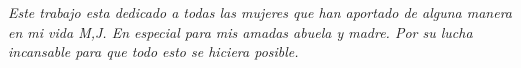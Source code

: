 
\begin{dedication} %

\textit{Este trabajo esta dedicado a todas las mujeres que han aportado de alguna manera en mi vida M,J. En especial para mis amadas abuela y madre. Por su lucha incansable para que todo esto se hiciera posible.}

\end{dedication}

